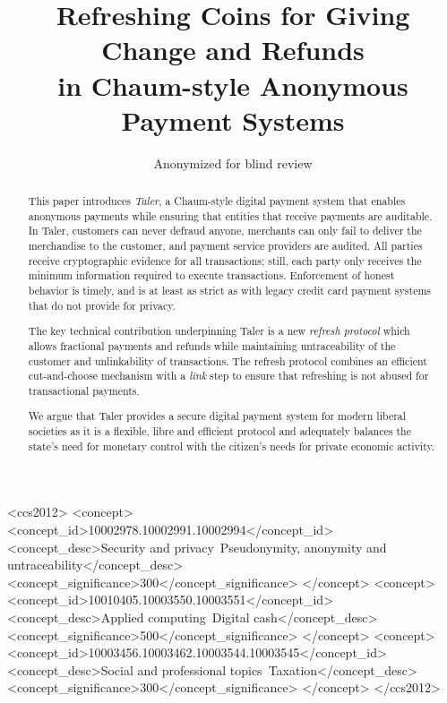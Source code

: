 \documentclass[sigconf, authordraft]{acmart}
\begin{document}
\title{Refreshing Coins for Giving Change and Refunds \\ in Chaum-style Anonymous Payment Systems}


%
%

\author{Anonymized for blind review}


\begin{abstract}
This paper introduces {\em Taler}, a Chaum-style digital payment system that
enables anonymous payments while ensuring that entities that receive
payments are auditable.  In Taler, customers can
never defraud anyone, merchants can only fail to deliver the
merchandise to the customer, and payment service providers are
audited.
All parties receive cryptographic evidence for all
transactions; still, each party only receives the minimum information
required to execute transactions.  Enforcement of honest behavior is
timely, and is at least as strict as with legacy credit card payment
systems that do not provide for privacy.

The key technical contribution underpinning Taler is a new {\em
  refresh protocol} which allows fractional payments and refunds while
maintaining untraceability of the customer and unlinkability of
transactions.  The refresh protocol combines an
efficient cut-and-choose mechanism with a {\em link} step to ensure
that refreshing is not abused for transactional payments.

We argue that Taler provides a secure digital payment system for modern
liberal societies as it is a flexible, libre and efficient protocol
and adequately balances the state's need for monetary control with the
citizen's needs for private economic activity.
\end{abstract}

%
%
\begin{CCSXML}
<ccs2012>
<concept>
<concept_id>10002978.10002991.10002994</concept_id>
<concept_desc>Security and privacy~Pseudonymity, anonymity and untraceability</concept_desc>
<concept_significance>300</concept_significance>
</concept>
<concept>
<concept_id>10010405.10003550.10003551</concept_id>
<concept_desc>Applied computing~Digital cash</concept_desc>
<concept_significance>500</concept_significance>
</concept>
<concept>
<concept_id>10003456.10003462.10003544.10003545</concept_id>
<concept_desc>Social and professional topics~Taxation</concept_desc>
<concept_significance>300</concept_significance>
</concept>
</ccs2012>
\end{CCSXML}
\end{document}
